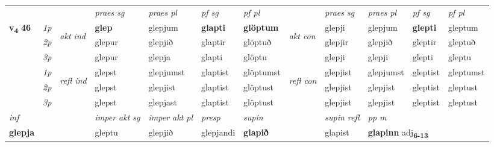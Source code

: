 \begin{longtable}[l]{X>{\footnotesize\itshape}llXXXXlXXXX}
\midrule

 & &   & \textit{praes sg}  & \textit{praes pl}    & \textit{ pf sg} & \textit{pf pl} & & \textit{praes sg}  & \textit{praes pl}    & \textit{pf sg} & \textit{pf pl }  \\ \cmidrule{4-7} \cmidrule{9-12}
 \multirow{2}{*}{{{\textbf{v{\textsubscript{4}}} \Large{\textbf{46}}}}}  & 1p & \multirow{3}{*}{\begin{turn}{90}\textit{akt ind}\end{turn}} & \textbf{glep} & glepjum & \textbf{glapti} & \textbf{glöptum} & \multirow{3}{*}{\begin{turn}{90}\textit{akt con}\end{turn}} &glepji & glepjum & \textbf{glepti} & gleptum\\*
 & 2p &  &  glepur  & glepjið & glaptir & glöptuð & & glepjir & glepjið & gleptir & gleptuð \\*
 & 3p &  & glepur & glepja & glapti & glöptu & & glepji & glepji& glepti & gleptu \\*
\cmidrule{4-7} \cmidrule{9-12}
 & 1p & \multirow{3}{*}{\begin{turn}{90}\textit{refl ind}\end{turn}}  & glepst & glepjumst & glaptist & glöptumst & \multirow{3}{*}{\begin{turn}{90}\textit{refl con}\end{turn}}  &glepjist & glepjumst & gleptist & gleptumst \\*
 & 2p &  & glepst & glepjist & glaptist & glöptust & &glepjist & glepjist & gleptist & gleptust \\*
 & 3p  & & glepst & glepjast & glaptist & glöptust & & glepjist & glepjist& gleptist & gleptust \\*
\cmidrule{4-7} \cmidrule{9-12}

   {\textit{inf}} & &  & \textit{imper akt sg} & \textit{imper akt pl}   & \textit{presp} & \textit{supin} && \textit{supin refl} & \textit{pp m} \\*
  {\textbf{glepja}} & && gleptu  & glepjið   & glepjandi &  \textbf{glapið} && glapist & \multicolumn{2}{l}{\textbf{glapinn} adj\textbf{\textsubscript{6-13}}} \\*

\midrule


\end{longtable}
